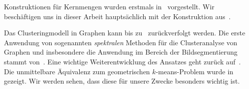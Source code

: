 Konstruktionen für Kernmengen wurden erstmals in~\cite{HarPeledM04} vorgestellt. Wir beschäftigen uns in dieser Arbeit
hauptsächlich mit der Konstruktion aus~\cite{Schmidt14}.

Das Clusteringmodell in Graphen kann bis zu~\cite{KernighanL70} zurückverfolgt werden. Die erste Anwendung von sogenannten
\emph{spektralen} Methoden für die Clusteranalyse von Graphen und insbesondere die Anwendung im Bereich der Bildsegmentierung
stammt von~\cite{ShiM00}. Eine wichtige Weiterentwicklung des Ansatzes geht zurück auf~\cite{NgJW01}. Die unmittelbare
Äquivalenz zum geometrischen $k$-means-Problem wurde in~\cite{DhillonGK04,DhillonGK07} gezeigt. Wir werden sehen, dass diese
für unsere Zwecke besonders wichtig ist.